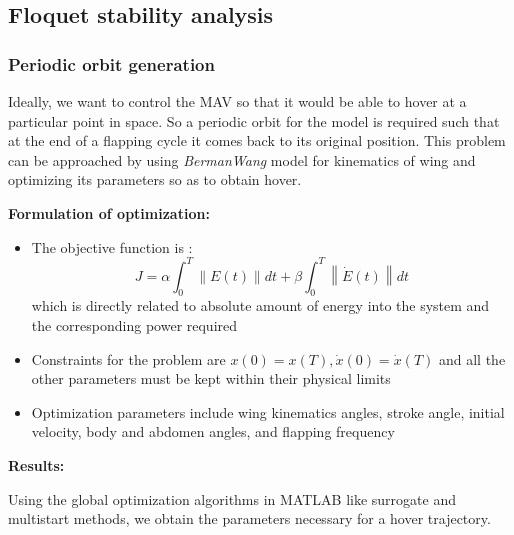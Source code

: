 \documentclass[10pt]{article}
\newcommand{\norm}[1]{\ensuremath{\left\| #1 \right\|}}
\begin{document}
\subsection{Floquet stability analysis}
\subsubsection{Periodic orbit generation}
Ideally, we want to control the MAV so that it would be able to hover at a particular point in space. So a periodic orbit for the model is required such that at the end of a flapping cycle it comes back to its original position. This problem can be approached by using \textit{BermanWang} model for kinematics of wing and optimizing its parameters so as to obtain hover.

\noindent \textbf{Formulation of optimization:}
\begin{itemize}
	\item The objective function is :
	\begin{equation}\label{eqn:obj_func}
		J = \alpha \int_{0}^{T} \norm{E(t)} dt + \beta \int_{0}^{T} \norm{\dot{E}(t)} dt
	\end{equation}
	which is directly related to absolute amount of energy into the system and the corresponding power required
	\item Constraints for the problem are $ x(0) = x(T), \dot{x}(0) = \dot{x}(T) $ and all the other parameters must be kept within their physical limits
	\item Optimization parameters include wing kinematics angles, stroke angle, initial velocity, body and abdomen angles, and flapping frequency
\end{itemize}

\noindent \textbf{Results:}

Using the global optimization algorithms in MATLAB like surrogate and multistart methods, we obtain the parameters necessary for a hover trajectory.
\end{document}
